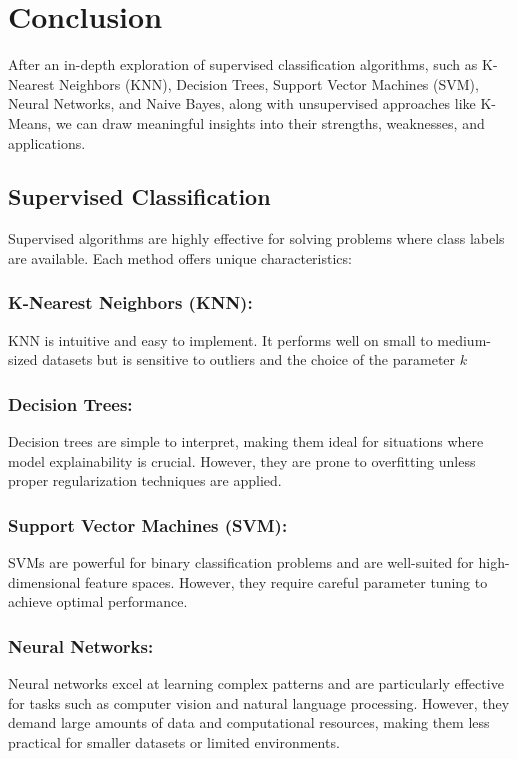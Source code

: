 \documentclass[a4paper,12pt]{article}
\begin{document}
\section{Conclusion}
After an in-depth exploration of supervised classification algorithms, such as K-Nearest Neighbors (KNN), Decision Trees, Support Vector Machines (SVM), Neural Networks, and Naive Bayes, along with unsupervised approaches like K-Means, we can draw meaningful insights into their strengths, weaknesses, and applications.

\subsection*{Supervised Classification}
Supervised algorithms are highly effective for solving problems where class labels are available. Each method offers unique characteristics:

\subsubsection*{K-Nearest Neighbors (KNN):}
KNN is intuitive and easy to implement. It performs well on small to medium-sized datasets but is sensitive to outliers and the choice of the parameter
\(k\)

\subsubsection*{Decision Trees:}
Decision trees are simple to interpret, making them ideal for situations where model explainability is crucial. However, they are prone to overfitting unless proper regularization techniques are applied.

\subsubsection*{Support Vector Machines (SVM):}
SVMs are powerful for binary classification problems and are well-suited for high-dimensional feature spaces. However, they require careful parameter tuning to achieve optimal performance.

\subsubsection*{Neural Networks:}
Neural networks excel at learning complex patterns and are particularly effective for tasks such as computer vision and natural language processing. However, they demand large amounts of data and computational resources, making them less practical for smaller datasets or limited environments.
\end{document}
